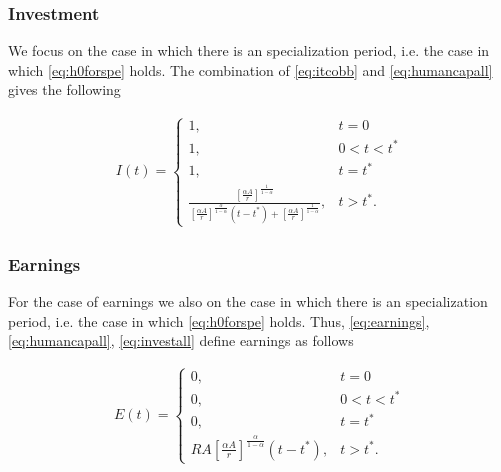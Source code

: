 \subsubsection{Investment}
We focus on the case in which there is an specialization period, i.e. the case in which \eqref{eq:h0forspe} holds. The combination of \eqref{eq:itcobb} and \eqref{eq:humancapall} gives the following

\begin{eqnarray}
I(t) =
\begin{cases}
1, & t = 0 \\
1, & 0 < t < t^* \\
1, & t = t^* \\
\frac{\left[ \frac{\alpha A}{r} \right]^{\frac{1}{1 - \alpha}}}{\left[ \frac{\alpha A}{r} \right]^{\frac{ \alpha }{1 - \alpha}} \left( t - t^* \right) + \left[ \frac{\alpha A}{r} \right]^{\frac{1}{1 - \alpha}}}, & t > t^*. \label{eq:investall}
\end{cases}
\end{eqnarray}

\subsubsection{Earnings}
For the case of earnings we also on the case in which there is an specialization period, i.e. the case in which \eqref{eq:h0forspe} holds. Thus, \eqref{eq:earnings}, \eqref{eq:humancapall}, \eqref{eq:investall} define earnings as follows

\begin{eqnarray}
E(t) =
\begin{cases}
0, & t = 0 \\
0, & 0 < t < t^* \\
0, & t = t^* \\
RA \left[ \frac{\alpha A}{r} \right]^{\frac{\alpha}{1 - \alpha}} \left( t - t^* \right) , & t > t^*. \label{eq:earnsall}
\end{cases}
\end{eqnarray}

